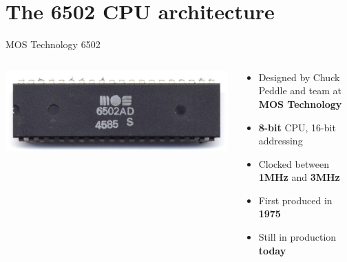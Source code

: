 \part{The 6502 CPU architecture}
\frame{\partpage}

\begin{frame}{MOS Technology 6502}
	\begin{columns}
		\begin{column}{0.4\textwidth}
			\includegraphics[width=\textwidth]{MOS_6502AD_4585_top}
		\end{column}
		\begin{column}{0.58\textwidth}
			\begin{itemize}
				\pause\item Designed by Chuck Peddle and team at \textbf{MOS Technology}
				\pause\item \textbf{8-bit} CPU, 16-bit addressing
				\pause\item Clocked between \textbf{1MHz} and \textbf{3MHz}
				\pause\item First produced in \textbf{1975}
				\pause\item Still in production \textbf{today}
			\end{itemize}
		\end{column}
	\end{columns}
\end{frame}

